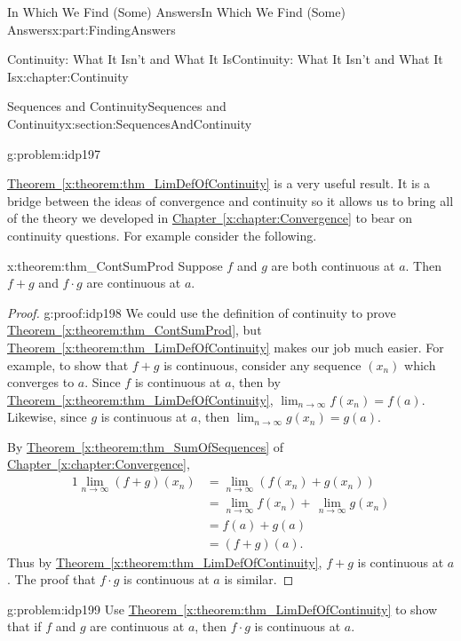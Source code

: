 \documentclass[oneside,10pt,]{book}
\newcommand{\xreffont}{\relax}
\numberwithin{equation}{section}
\newcommand{\amp}{&}
\begin{document}
\begin{partptx}{In Which We Find (Some) Answers}{}{In Which We Find (Some) Answers}{}{}{x:part:FindingAnswers}
\begin{chapterptx}{Continuity: What It Isn't and What It Is}{}{Continuity: What It Isn't and What It Is}{}{}{x:chapter:Continuity}
\begin{sectionptx}{Sequences and Continuity}{}{Sequences and Continuity}{}{}{x:section:SequencesAndContinuity}
\begin{problem}{}{g:problem:idp197}
\end{problem}
\hyperref[x:theorem:thm_LimDefOfContinuity]{Theorem~{\xreffont\ref{x:theorem:thm_LimDefOfContinuity}}} is a very useful result. It is a bridge between the ideas of convergence and continuity so it allows us to bring all of the theory we developed in \hyperref[x:chapter:Convergence]{Chapter~{\xreffont\ref{x:chapter:Convergence}}} to bear on continuity questions. For example consider the following.%
\begin{theorem}{}{}{x:theorem:thm_ContSumProd}%
 Suppose \(f\) and \(g\) are both continuous at \(a\). Then \(f+g\) and \(f\cdot g\) are continuous at \(a\).%
\end{theorem}
\begin{proof}{}{g:proof:idp198}
We could use the definition of continuity to prove \hyperref[x:theorem:thm_ContSumProd]{Theorem~{\xreffont\ref{x:theorem:thm_ContSumProd}}}, but \hyperref[x:theorem:thm_LimDefOfContinuity]{Theorem~{\xreffont\ref{x:theorem:thm_LimDefOfContinuity}}} makes our job much easier.  For example, to show that \(f+g\) is continuous, consider any sequence \(\left(x_n\right)\) which converges to \(a\).  Since \(f\) is continuous at \(a\), then by \hyperref[x:theorem:thm_LimDefOfContinuity]{Theorem~{\xreffont\ref{x:theorem:thm_LimDefOfContinuity}}}, \(\lim_{n\rightarrow\infty}f(x_n)=f(a)\).  Likewise, since \(g\) is continuous at \(a\), then \(\lim_{n\rightarrow\infty}g(x_n)=g(a)\).%
\par
By \hyperref[x:theorem:thm_SumOfSequences]{Theorem~{\xreffont\ref{x:theorem:thm_SumOfSequences}}} of \hyperref[x:chapter:Convergence]{Chapter~{\xreffont\ref{x:chapter:Convergence}}},\(\)%
\begin{alignat*}{1}
\lim_{n\rightarrow\infty}(f+g)(x_n)\amp=\lim_{n\rightarrow\infty} \left(f(x_n)+g(x_n)\right)\\
\amp =\lim_{n\rightarrow\infty}f(x_n)+\,\lim_{n \rightarrow\infty}g(x_n)\\
\amp =f(a)+g(a)\\
\amp =(f+g)(a)\text{.}
\end{alignat*}
Thus by \hyperref[x:theorem:thm_LimDefOfContinuity]{Theorem~{\xreffont\ref{x:theorem:thm_LimDefOfContinuity}}}, \(f+g\) is continuous at \(a\).  The proof that \(f\cdot g\) is continuous at \(a\) is similar.%
\end{proof}
\begin{problem}{}{g:problem:idp199}%
Use \hyperref[x:theorem:thm_LimDefOfContinuity]{Theorem~{\xreffont\ref{x:theorem:thm_LimDefOfContinuity}}} to show that if \(f\) and \(g\) are continuous at \(a\), then \(f\cdot g\) is continuous at \(a\).%

\end{problem}
\end{sectionptx}
\end{chapterptx}
\end{partptx}
\end{document}
